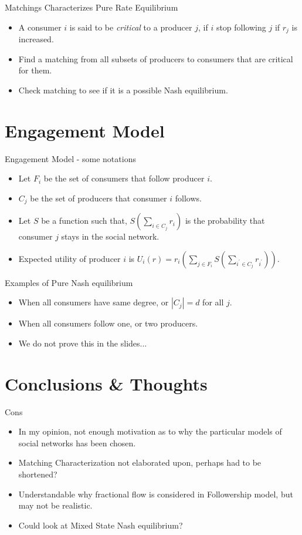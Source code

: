 \documentclass[aspectratio=169]{beamer}
\newcommand{\bi}{\begin{itemize}}
\newcommand{\ei}{\end{itemize}}
\begin{document}
\begin{frame}{Matchings Characterizes Pure Rate Equilibrium}
    \bi
\item A consumer $i$ is said to be \textit{critical} to a producer $j$, if $i$
    stop following $j$ if $r_j$ is increased.
    \pause
\item Find a matching from all subsets of producers to consumers that are
    critical for them.
    \pause
\item Check matching to see if it is a possible Nash equilibrium.
    \ei
\end{frame}

\section{Engagement Model}
\begin{frame}{Engagement Model - some notations}
    \bi
\item Let $F_i$ be the set of consumers that follow producer $i$.
    \pause
\item $C_j$ be the set of producers that consumer $i$ follows.
    \pause
\item Let $S$ be a function such that, $S(\sum_{i \in C_j}r_i)$ is the
    probability that consumer $j$ stays in the social network.
    \pause
\item Expected utility of producer $i$ is $U_{i}(r) = r_i(\sum_{j \in
        F_i}S(\sum_{i^{\prime}\in C_j}r_{i^{\prime}}))$.
    \ei
\end{frame}

\begin{frame}{Examples of Pure Nash equilibrium}
    \bi
\item When all consumers have same degree, or $|C_j| = d$ for all $j$.
    \pause
\item When all consumers follow one, or two producers.
    \pause
\item We do not prove this in the slides...
    \ei
\end{frame}

\section{Conclusions \& Thoughts}
\begin{frame}{Cons}
    \bi
\item In my opinion, not enough motivation as to why the particular models of social networks
    has been chosen.
\item Matching Characterization not elaborated upon, perhaps had to be
    shortened?
\item Understandable why fractional flow is considered in Followership model,
    but may not be realistic.
\item Could look at Mixed State Nash equilibrium?
    \ei
\end{frame}
\end{document}
